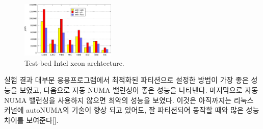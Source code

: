 \else
\fi

\begin{figure}[h]
  \begin{center}
     \includegraphics[width=0.4\textwidth]{graph/SPECjbb2013}
  \end{center}
  \caption{Test-bed Intel xeon archtecture.}
  \label{fig:basic}
\end{figure}

\ifkor
실험 결과 대부분 응용프로그램에서 최적화된 파티션으로 설정한 방법이 가장 좋은 
성능을 보였고, 다음으로 자동 NUMA 밸런싱이 좋은 성능을 나타낸다. 
마지막으로 자동 NUMA 밸런싱을 사용하지 않으면 최악의 성능을 보였다.
이것은 아직까지는 리눅스 커널에 autoNUMA의 기술이 향상 되고 있어도, 
잘 파티션되어 동작할 때와 많은 성능 차이를 보여준다[]. 
\else
\fi

